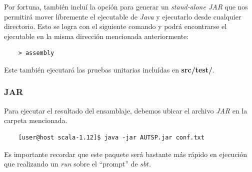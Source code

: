 \documentclass[12pt]{article}
\begin{document}
Por fortuna, también incluí la opción para generar un \textit{stand-alone JAR} que nos permitirá mover líbremente el ejecutable de \textit{Java} y ejecutarlo desde cualquier directorio. Esto se logra con el
siguiente comando y podrá encontrarse el ejecutable en la misma dirección mencionada anteriormente:
\begin{verbatim}
    > assembly
\end{verbatim}
Este también ejecutará las pruebas unitarias incluídas en \textbf{src/test/}.

\subsubsection*{JAR}
Para ejecutar el resultado del ensamblaje, debemos ubicar el archivo \textit{JAR} en la carpeta mencionada.
\begin{verbatim}
    [user@host scala-1.12]$ java -jar AUTSP.jar conf.txt
\end{verbatim}
Es importante recordar que este paquete será bastante más rápido en ejecución que realizando un \textit{run} sobre el ``prompt'' de $sbt$.
\end{document}
